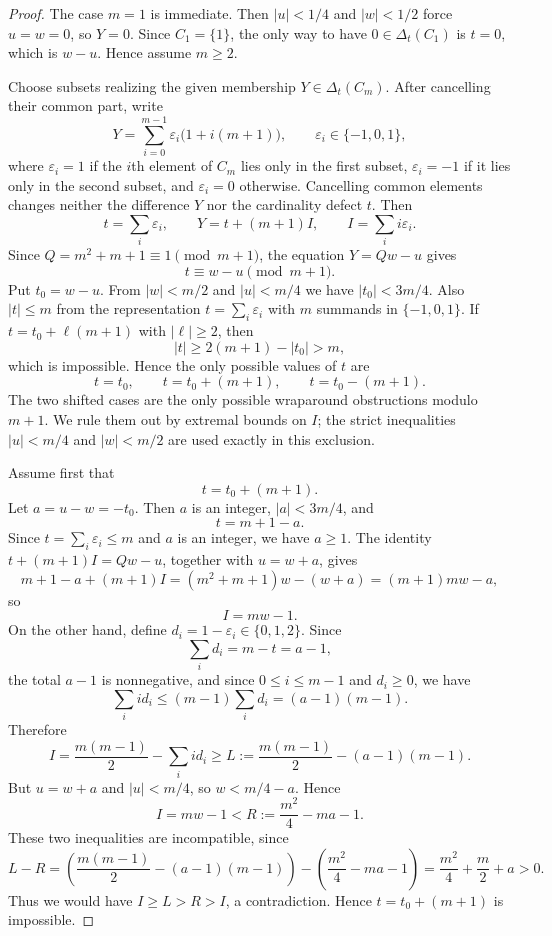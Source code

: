 \documentclass[11pt]{article}
\newcommand{\eps}{\varepsilon}
\newcommand{\D}{\Delta}
\begin{document}
\begin{proof}
The case $m=1$ is immediate.  Then $|u|<1/4$ and $|w|<1/2$ force $u=w=0$, so $Y=0$.  Since $C_1=\{1\}$, the only way to have $0\in\D_t(C_1)$ is $t=0$, which is $w-u$.  Hence assume $m\ge2$.

Choose subsets realizing the given membership $Y\in\D_t(C_m)$.  After cancelling their common part, write
\[
        Y=\sum_{i=0}^{m-1}\eps_i\bigl(1+i(m+1)\bigr),
        \qquad
        \eps_i\in\{-1,0,1\},
\]
where $\eps_i=1$ if the $i$th element of $C_m$ lies only in the first subset, $\eps_i=-1$ if it lies only in the second subset, and $\eps_i=0$ otherwise.  Cancelling common elements changes neither the difference $Y$ nor the cardinality defect $t$.  Then
\[
        t=\sum_i\eps_i,
        \qquad
        Y=t+(m+1)I,
        \qquad
        I=\sum_i i\eps_i.
\]
Since $Q=m^2+m+1\equiv1\pmod {m+1}$, the equation $Y=Qw-u$ gives
\[
        t\equiv w-u\pmod {m+1}.
\]
Put $t_0=w-u$.  From $|w|<m/2$ and $|u|<m/4$ we have $|t_0|<3m/4$.  Also $|t|\le m$ from the representation $t=\sum_i\eps_i$ with $m$ summands in $\{-1,0,1\}$.  If $t=t_0+\ell(m+1)$ with $|\ell|\ge2$, then
\[
        |t|\ge 2(m+1)-|t_0|>m,
\]
which is impossible.  Hence the only possible values of $t$ are
\[
        t=t_0,
        \qquad
        t=t_0+(m+1),
        \qquad
        t=t_0-(m+1).
\]
The two shifted cases are the only possible wraparound obstructions modulo $m+1$.  We rule them out by extremal bounds on $I$; the strict inequalities $|u|<m/4$ and $|w|<m/2$ are used exactly in this exclusion.

Assume first that
\[
        t=t_0+(m+1).
\]
Let $a=u-w=-t_0$.  Then $a$ is an integer, $|a|<3m/4$, and
\[
        t=m+1-a.
\]
Since $t=\sum_i\eps_i\le m$ and $a$ is an integer, we have $a\ge1$.  The identity $t+(m+1)I=Qw-u$, together with $u=w+a$, gives
\[
        m+1-a+(m+1)I=(m^2+m+1)w-(w+a)=(m+1)mw-a,
\]
so
\[
        I=mw-1.
\]
On the other hand, define $d_i=1-\eps_i\in\{0,1,2\}$.  Since
\[
        \sum_i d_i=m-t=a-1,
\]
the total $a-1$ is nonnegative, and since $0\le i\le m-1$ and $d_i\ge0$, we have
\[
        \sum_i i d_i\le (m-1)\sum_i d_i=(a-1)(m-1).
\]
Therefore
\[
        I
        =\frac{m(m-1)}2-\sum_i i d_i
        \ge
        L:=\frac{m(m-1)}2-(a-1)(m-1).
\]
But $u=w+a$ and $|u|<m/4$, so $w<m/4-a$.  Hence
\[
        I=mw-1<R:=\frac{m^2}{4}-ma-1.
\]
These two inequalities are incompatible, since
\[
        L-R
        =
        \left(
        \frac{m(m-1)}2-(a-1)(m-1)
        \right)
        -
        \left(
        \frac{m^2}{4}-ma-1
        \right)
        =
        \frac{m^2}{4}+\frac m2+a>0.
\]
Thus we would have $I\ge L>R>I$, a contradiction.  Hence $t=t_0+(m+1)$ is impossible.


\end{proof}
\end{document}

